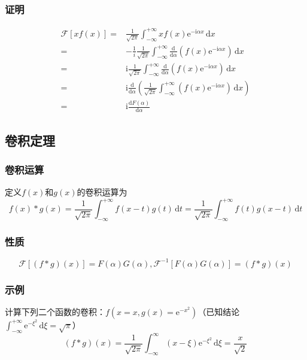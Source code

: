 \subsubsection{证明}
\begin{align*}
\mathscr{F}[xf(x)]=&\frac{1}{\sqrt{2\pi}}\int_{-\infty}^{+\infty}{xf(x)\mathrm{e}^{-\mathrm{i}\alpha x}\,\mathrm{d}x}\\
=&-\frac{1}{i}\frac{1}{\sqrt{2\pi}}\int_{-\infty}^{+\infty}{\frac{\mathrm{d}}{\mathrm{d}\alpha}(f(x)\mathrm{e}^{-\mathrm{i}\alpha x})\,\mathrm{d}x}\\
=&\mathrm{i}\frac{1}{\sqrt{2\pi}}\int_{-\infty}^{+\infty}{\frac{\mathrm{d}}{\mathrm{d}\alpha}(f(x)\mathrm{e}^{-\mathrm{i}\alpha x})\,\mathrm{d}x}\\
=&\mathrm{i}\frac{\mathrm{d}}{\mathrm{d}\alpha}\left(\frac{1}{\sqrt{2\pi}}\int_{-\infty}^{+\infty}(f(x)\mathrm{e}^{-\mathrm{i}\alpha x})\,\mathrm{d}x\right)\\
=&\mathrm{i}\frac{\mathrm{d}F(\alpha)}{\mathrm{d}\alpha}
\end{align*}

\subsection{卷积定理}

\subsubsection{卷积运算}

定义\(f(x)\)和\(g(x)\)的卷积运算为
\[
f(x)*g(x)=\frac{1}{\sqrt{2\pi}}\int_{-\infty}^{+\infty} f(x-t)g(t)\,\mathrm{d}t=\frac{1}{\sqrt{2\pi}}\int_{-\infty}^{+\infty} f(t)g(x-t)\,\mathrm{d}t
\]

\subsubsection{性质}
\[
\mathscr{F}[(f*g)(x)]=F(\alpha)G(\alpha),\mathscr{F}^{-1}[F(\alpha)G(\alpha)]=(f*g)(x) 
\]

\subsubsection{示例}

计算下列二个函数的卷积：\(f(x=x,g(x)=\mathrm{e}^{-x^2})\)（已知结论\(\int_{-\infty}^{+\infty}\mathrm{e}^{-\xi^2}\,\mathrm{d}\xi=\sqrt\pi\)）
\[
(f*g)(x)=\frac{1}{\sqrt{2\pi}}\int_{-\infty}^{\infty}{(x-\xi)\mathrm{e}^{-\xi^2}\,\mathrm{d}\xi}=\frac{x}{\sqrt2}
\]

